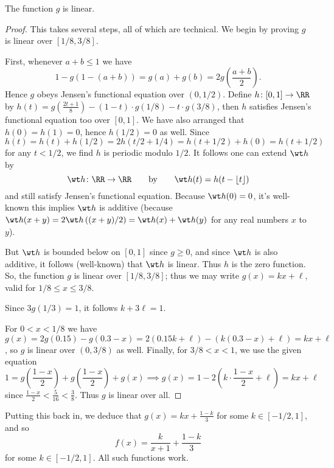 \documentclass[11pt]{scrartcl}
\begin{document}
\begin{claim*}
  The function $g$ is linear.
\end{claim*}
\begin{proof}
  This takes several steps, all of which are technical.
  We begin by proving $g$ is linear over $[1/8, 3/8]$.
  \begin{itemize}
    \ii First, whenever $a+b \le 1$ we have
    \[ 1 - g(1-(a+b)) = g(a) + g(b) = 2 g\left( \frac{a+b}{2} \right). \]
    Hence $g$ obeys Jensen's functional equation over $(0,1/2)$.
    \ii Define $h \colon [0,1] \to \RR$
    by $h(t) = g(\frac{2t+1}{8}) - (1-t) \cdot g(1/8) - t \cdot g(3/8)$,
    then $h$ satisfies Jensen's functional equation too over $[0,1]$.
    We have also arranged that $h(0) = h(1) = 0$, hence $h(1/2) = 0$ as well.
    \ii Since
    \[ h(t) = h(t) + h(1/2) = 2h(t/2+1/4)
      = h(t+1/2) + h(0) = h(t+1/2) \]
    for any $t < 1/2$, we find $h$ is periodic modulo $1/2$.
    It follows one can extend $\wt h$ by
    \[ \wt h \colon \RR \to \RR \qquad\text{by}\qquad
      \wt h(t) = h(t - \left\lfloor t \right\rfloor) \]
    and still satisfy Jensen's functional equation.
    Because $\wt h(0) = 0$, it's well-known this implies $\wt h$ is additive
    (because $\wt h(x+y) = 2\wt h\left( (x+y)/2 \right) = \wt h(x) + \wt h(y)$
    for any real numbers $x$ to $y$).
  \end{itemize}
  But $\wt h$ is bounded below on $[0,1]$ since $g \ge 0$,
  and since $\wt h$ is also additive,
  it follows (well-known) that $\wt h$ is linear.
  Thus $h$ is the zero function.
  So, the function $g$ is linear over $[1/8,3/8]$;
  thus we may write $g(x) = kx + \ell$, valid for $1/8 \le x \le 3/8$.

  Since $3g(1/3) = 1$, it follows $k + 3\ell = 1$.

  For $0 < x < 1/8$ we have
  $g(x) = 2g(0.15) - g(0.3-x) = 2(0.15k+\ell) - (k(0.3-x)+\ell) = kx+\ell$,
  so $g$ is linear over $(0,3/8)$ as well.
  Finally, for $3/8 < x < 1$, we use the given equation
  \[
    1 = g\left( \frac{1-x}{2} \right)
    + g\left( \frac{1-x}{2} \right)
    + g(x)
    \implies g(x) = 1 - 2\left( k \cdot \frac{1-x}{2} + \ell \right)
    = kx+\ell
  \]
  since $\frac{1-x}{2} < \frac{5}{16} < \frac{3}{8}$.
  Thus $g$ is linear over all.
\end{proof}

Putting this back in,
we deduce that $g(x) = kx + \frac{1-k}{3}$ for some $k \in [-1/2,1]$,
and so \[ f(x) = \frac{k}{x+1} + \frac{1-k}{3} \]
for some $k \in [-1/2,1]$.
All such functions work.
\pagebreak
\end{document}
